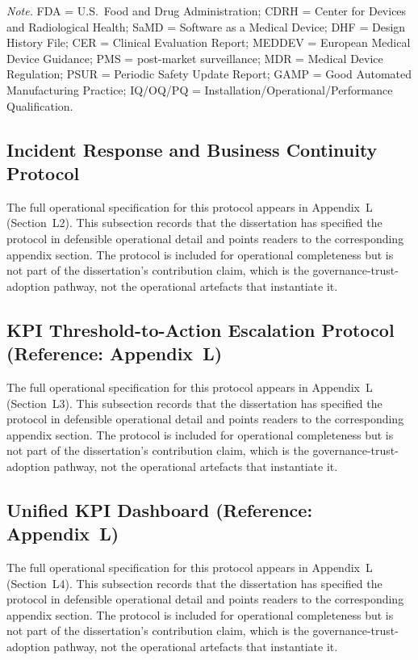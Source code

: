 \vspace{0.5em}\noindent\textit{Note.} FDA = U.S.\ Food and Drug Administration; CDRH = Center for Devices and Radiological Health; SaMD = Software as a Medical Device; DHF = Design History File; CER = Clinical Evaluation Report; MEDDEV = European Medical Device Guidance; PMS = post-market surveillance; MDR = Medical Device Regulation; PSUR = Periodic Safety Update Report; GAMP = Good Automated Manufacturing Practice; IQ/OQ/PQ = Installation/Operational/Performance Qualification.

\subsection{Incident Response and Business Continuity Protocol}

\noindent The full operational specification for this protocol appears in Appendix~L (Section~L2). This subsection records that the dissertation has specified the protocol in defensible operational detail and points readers to the corresponding appendix section. The protocol is included for operational completeness but is not part of the dissertation's contribution claim, which is the governance-trust-adoption pathway, not the operational artefacts that instantiate it.

\subsection{KPI Threshold-to-Action Escalation Protocol (Reference: Appendix~L)}

\noindent The full operational specification for this protocol appears in Appendix~L (Section~L3). This subsection records that the dissertation has specified the protocol in defensible operational detail and points readers to the corresponding appendix section. The protocol is included for operational completeness but is not part of the dissertation's contribution claim, which is the governance-trust-adoption pathway, not the operational artefacts that instantiate it.

\subsection{Unified KPI Dashboard (Reference: Appendix~L)}

\noindent The full operational specification for this protocol appears in Appendix~L (Section~L4). This subsection records that the dissertation has specified the protocol in defensible operational detail and points readers to the corresponding appendix section. The protocol is included for operational completeness but is not part of the dissertation's contribution claim, which is the governance-trust-adoption pathway, not the operational artefacts that instantiate it.

